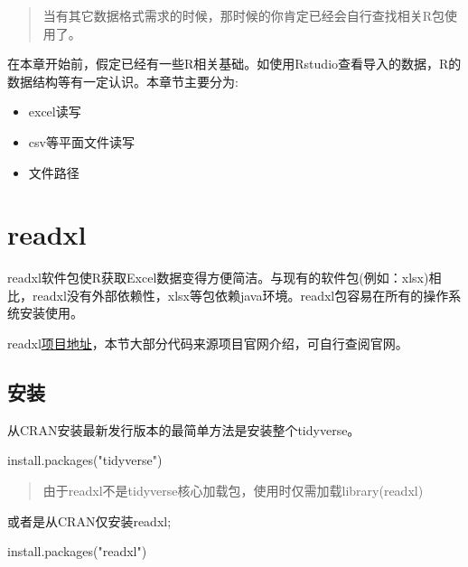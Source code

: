 \documentclass[
]{book}
\newenvironment{Shaded}{\begin{snugshade}}{\end{snugshade}}
\newcommand{\FunctionTok}[1]{\textcolor[rgb]{0.00,0.00,0.00}{#1}}
\newcommand{\NormalTok}[1]{#1}
\newcommand{\StringTok}[1]{\textcolor[rgb]{0.31,0.60,0.02}{#1}}
\providecommand{\tightlist}{%
  \setlength{\itemsep}{0pt}\setlength{\parskip}{0pt}}
\begin{document}
\begin{quote}
当有其它数据格式需求的时候，那时候的你肯定已经会自行查找相关R包使用了。
\end{quote}

在本章开始前，假定已经有一些R相关基础。如使用Rstudio查看导入的数据，R的数据结构等有一定认识。本章节主要分为:

\begin{itemize}
\tightlist
\item
  excel读写
\item
  csv等平面文件读写
\item
  文件路径
\end{itemize}

\hypertarget{readxl:description}{%
\section{readxl}\label{readxl:description}}

readxl软件包使R获取Excel数据变得方便简洁。与现有的软件包(例如：xlsx)相比，readxl没有外部依赖性，xlsx等包依赖java环境。readxl包容易在所有的操作系统安装使用。

readxl\href{https://readxl.tidyverse.org/}{项目地址}，本节大部分代码来源项目官网介绍，可自行查阅官网。

\hypertarget{readxl:install}{%
\subsection{安装}\label{readxl:install}}

从CRAN安装最新发行版本的最简单方法是安装整个tidyverse。

\begin{Shaded}
\begin{Highlighting}[]
\FunctionTok{install.packages}\NormalTok{(}\StringTok{"tidyverse"}\NormalTok{)}
\end{Highlighting}
\end{Shaded}

\begin{quote}
由于readxl不是tidyverse核心加载包，使用时仅需加载library(readxl)
\end{quote}

或者是从CRAN仅安装readxl;

\begin{Shaded}
\begin{Highlighting}[]
\FunctionTok{install.packages}\NormalTok{(}\StringTok{"readxl"}\NormalTok{)}
\end{Highlighting}
\end{Shaded}
\end{document}
